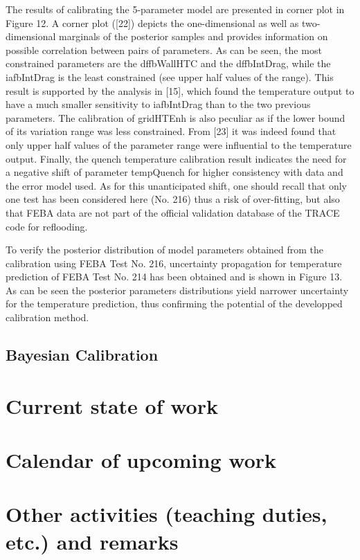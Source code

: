 \documentclass[11pt,titlepage]{article}
\begin{document}
The results of calibrating the 5-parameter model are presented in corner plot in Figure 12. A corner plot ([22]) depicts the one-dimensional as well as two-dimensional marginals of the posterior samples and provides information on possible correlation between pairs of parameters. As can be seen, the most constrained parameters are the dffbWallHTC and the dffbIntDrag, while the iafbIntDrag is the least constrained (see upper half values of the range). This result is supported by the analysis in [15], which found the temperature output to have a much smaller sensitivity to iafbIntDrag than to the two previous parameters. The calibration of gridHTEnh is also peculiar as if the lower bound of its variation range was less constrained. From [23] it was indeed found that only upper half values of the parameter range were influential to the temperature output. Finally, the quench temperature calibration result indicates the need for a negative shift of parameter tempQuench for higher consistency with data and the error model used. As for this unanticipated shift, one should recall that only one test has been considered here (No. 216) thus a risk of over-fitting, but also that FEBA data are not part of the official validation database of the TRACE code for reflooding. 



To verify the posterior distribution of model parameters obtained from the calibration using FEBA Test No. 216, uncertainty propagation for temperature prediction of FEBA Test No. 214 has been obtained and is shown in Figure 13. As can be seen the posterior parameters distributions yield narrower uncertainty for the temperature prediction, thus confirming the potential of the developped calibration method.


\subsection{Bayesian Calibration}

\section{Current state of work}

\section{Calendar of upcoming work}

\section{Other activities (teaching duties, etc.) and remarks}
\end{document}
